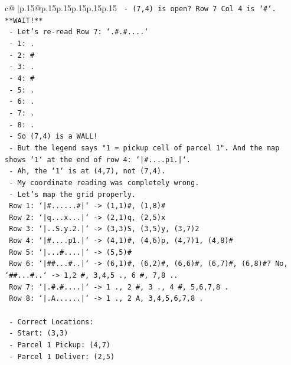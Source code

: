 \documentclass{article}
\begin{document}
{\begin{supertabular}{c@{$\;$}|p{.15\linewidth}@{}p{.15\linewidth}p{.15\linewidth}p{.15\linewidth}p{.15\linewidth}p{.15\linewidth}}
{{{\texttt{        {-} (7,4) is open? Row 7 Col 4 is `\#`. **WAIT!**} \\
\texttt{        {-} Let's re{-}read Row 7: `.\#.\#....`} \\
\texttt{          {-} 1: .} \\
\texttt{          {-} 2: \#} \\
\texttt{          {-} 3: .} \\
\texttt{          {-} 4: \#} \\
\texttt{          {-} 5: .} \\
\texttt{          {-} 6: .} \\
\texttt{          {-} 7: .} \\
\texttt{          {-} 8: .} \\
\texttt{        {-} So (7,4) is a WALL!} \\
\texttt{        {-} But the legend says "1 = pickup cell of parcel 1". And the map shows `1` at the end of row 4: `|\#....p1.|`.} \\
\texttt{        {-} Ah, the `1` is at (4,7), not (7,4).} \\
\texttt{        {-} My coordinate reading was completely wrong.} \\
\texttt{        {-} Let's map the grid properly.} \\
\texttt{          Row 1: `|\#......\#|` {-}> (1,1)\#, (1,8)\#} \\
\texttt{          Row 2: `|q...x...|` {-}> (2,1)q, (2,5)x} \\
\texttt{          Row 3: `|..S.y.2.|` {-}> (3,3)S, (3,5)y, (3,7)2} \\
\texttt{          Row 4: `|\#....p1.|` {-}> (4,1)\#, (4,6)p, (4,7)1, (4,8)\#} \\
\texttt{          Row 5: `|...\#....|` {-}> (5,5)\#} \\
\texttt{          Row 6: `|\#\#...\#..|` {-}> (6,1)\#, (6,2)\#, (6,6)\#, (6,7)\#, (6,8)\#? No, `\#\#...\#..` {-}> 1,2 \#, 3,4,5 ., 6 \#, 7,8 ..} \\
\texttt{          Row 7: `|.\#.\#....|` {-}> 1 ., 2 \#, 3 ., 4 \#, 5,6,7,8 .} \\
\texttt{          Row 8: `|.A......|` {-}> 1 ., 2 A, 3,4,5,6,7,8 .} \\
\\ 
\texttt{        {-} Correct Locations:} \\
\texttt{          {-} Start: (3,3)} \\
\texttt{          {-} Parcel 1 Pickup: (4,7)} \\
\texttt{          {-} Parcel 1 Deliver: (2,5)} \\
}}}
\end{supertabular}}
\end{document}
